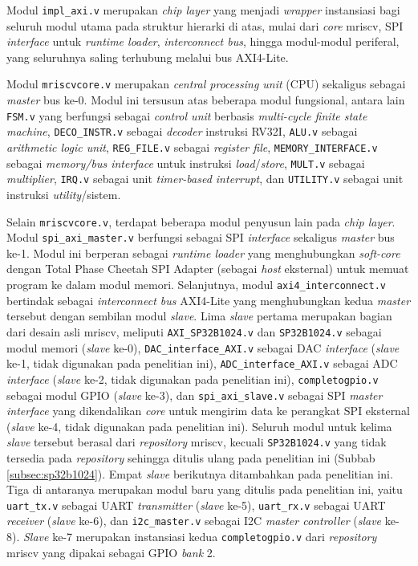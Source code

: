 Modul \texttt{impl\_axi.v} merupakan \textit{chip layer} yang menjadi \textit{wrapper} instansiasi bagi seluruh modul utama pada struktur hierarki di atas, mulai dari \textit{core} mriscv, SPI \textit{interface} untuk \textit{runtime loader}, \textit{interconnect bus}, hingga modul-modul periferal, yang seluruhnya saling terhubung melalui bus AXI4-Lite.

Modul \texttt{mriscvcore.v} merupakan \textit{central processing unit} (CPU) sekaligus sebagai \textit{master} bus ke-0. Modul ini tersusun atas beberapa modul fungsional, antara lain \texttt{FSM.v} yang berfungsi sebagai \textit{control unit} berbasis \textit{multi-cycle finite state machine}, \texttt{DECO\_INSTR.v} sebagai \textit{decoder} instruksi RV32I, \texttt{ALU.v} sebagai \textit{arithmetic logic unit}, \texttt{REG\_FILE.v} sebagai \textit{register file}, \texttt{MEMORY\_INTERFACE.v} sebagai \textit{memory/bus interface} untuk instruksi \textit{load}/\textit{store}, \texttt{MULT.v} sebagai \textit{multiplier}, \texttt{IRQ.v} sebagai unit \textit{timer-based interrupt}, dan \texttt{UTILITY.v} sebagai unit instruksi \textit{utility}/sistem.

Selain \texttt{mriscvcore.v}, terdapat beberapa modul penyusun lain pada \textit{chip layer}. Modul \texttt{spi\_axi\_master.v} berfungsi sebagai SPI \textit{interface} sekaligus \textit{master} bus ke-1. Modul ini berperan sebagai \textit{runtime loader} yang menghubungkan \textit{soft-core} dengan Total Phase Cheetah SPI Adapter (sebagai \textit{host} eksternal) untuk memuat program ke dalam modul memori. Selanjutnya, modul \texttt{axi4\_interconnect.v} bertindak sebagai \textit{interconnect bus} AXI4-Lite yang menghubungkan kedua \textit{master} tersebut dengan sembilan modul \textit{slave}. Lima \textit{slave} pertama merupakan bagian dari desain asli mriscv, meliputi \texttt{AXI\_SP32B1024.v} dan \texttt{SP32B1024.v} sebagai modul memori (\textit{slave} ke-0), \texttt{DAC\_interface\_AXI.v} sebagai DAC \textit{interface} (\textit{slave} ke-1, tidak digunakan pada penelitian ini), \texttt{ADC\_interface\_AXI.v} sebagai ADC \textit{interface} (\textit{slave} ke-2, tidak digunakan pada penelitian ini), \texttt{completogpio.v} sebagai modul GPIO (\textit{slave} ke-3), dan \texttt{spi\_axi\_slave.v} sebagai SPI \textit{master interface} yang dikendalikan \textit{core} untuk mengirim data ke perangkat SPI eksternal (\textit{slave} ke-4, tidak digunakan pada penelitian ini). Seluruh modul untuk kelima \textit{slave} tersebut berasal dari \textit{repository} mriscv, kecuali \texttt{SP32B1024.v} yang tidak tersedia pada \textit{repository} sehingga ditulis ulang pada penelitian ini (Subbab \ref{subsec:sp32b1024}). Empat \textit{slave} berikutnya ditambahkan pada penelitian ini. Tiga di antaranya merupakan modul baru yang ditulis pada penelitian ini, yaitu \texttt{uart\_tx.v} sebagai UART \textit{transmitter} (\textit{slave} ke-5), \texttt{uart\_rx.v} sebagai UART \textit{receiver} (\textit{slave} ke-6), dan \texttt{i2c\_master.v} sebagai I2C \textit{master controller} (\textit{slave} ke-8). \textit{Slave} ke-7 merupakan instansiasi kedua \texttt{completogpio.v} dari \textit{repository} mriscv yang dipakai sebagai GPIO \textit{bank} 2.


